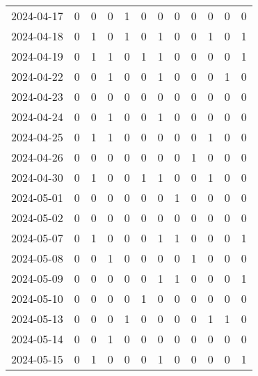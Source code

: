 \documentclass[dvipdfmx,oneside]{article}
\begin{document}
\begin{tabular}{lccccccccccc}
        2024-04-17 &     0 &     0 &     0 &     1 &     0 &     0 &     0 &     0 &     0 &     0 &     0 \\
        2024-04-18 &     0 &     1 &     0 &     1 &     0 &     1 &     0 &     0 &     1 &     0 &     1 \\
        2024-04-19 &     0 &     1 &     1 &     0 &     1 &     1 &     0 &     0 &     0 &     0 &     1 \\
        2024-04-22 &     0 &     0 &     1 &     0 &     0 &     1 &     0 &     0 &     0 &     1 &     0 \\
        2024-04-23 &     0 &     0 &     0 &     0 &     0 &     0 &     0 &     0 &     0 &     0 &     0 \\
        2024-04-24 &     0 &     0 &     1 &     0 &     0 &     1 &     0 &     0 &     0 &     0 &     0 \\
        2024-04-25 &     0 &     1 &     1 &     0 &     0 &     0 &     0 &     0 &     1 &     0 &     0 \\
        2024-04-26 &     0 &     0 &     0 &     0 &     0 &     0 &     0 &     1 &     0 &     0 &     0 \\
        2024-04-30 &     0 &     1 &     0 &     0 &     1 &     1 &     0 &     0 &     1 &     0 &     0 \\
        2024-05-01 &     0 &     0 &     0 &     0 &     0 &     0 &     1 &     0 &     0 &     0 &     0 \\
        2024-05-02 &     0 &     0 &     0 &     0 &     0 &     0 &     0 &     0 &     0 &     0 &     0 \\
        2024-05-07 &     0 &     1 &     0 &     0 &     0 &     1 &     1 &     0 &     0 &     0 &     1 \\
        2024-05-08 &     0 &     0 &     1 &     0 &     0 &     0 &     0 &     1 &     0 &     0 &     0 \\
        2024-05-09 &     0 &     0 &     0 &     0 &     0 &     1 &     1 &     0 &     0 &     0 &     1 \\
        2024-05-10 &     0 &     0 &     0 &     0 &     1 &     0 &     0 &     0 &     0 &     0 &     0 \\
        2024-05-13 &     0 &     0 &     0 &     1 &     0 &     0 &     0 &     0 &     1 &     1 &     0 \\
        2024-05-14 &     0 &     0 &     1 &     0 &     0 &     0 &     0 &     0 &     0 &     0 &     0 \\
        2024-05-15 &     0 &     1 &     0 &     0 &     0 &     1 &     0 &     0 &     0 &     0 &     1 \\

\end{tabular}
\end{document}
